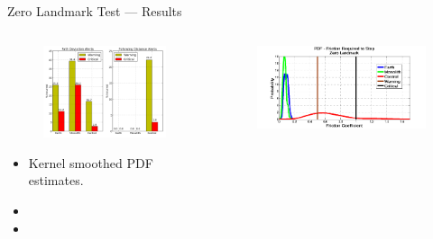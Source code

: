 \documentclass{beamer}
\begin{document}
    \begin{frame}{Zero Landmark Test --- Results}
      \begin{columns}
        \begin{column}{0.5\textwidth}
          \begin{figure}
            \includegraphics[width=\textwidth]{../graphics/zero_landmark_alert_percents.png}
          \end{figure}
          \begin{itemize} \scriptsize
            \item Kernel smoothed PDF estimates.
            \item 
            \item 
          \end{itemize}
        \end{column}
        \begin{column}{0.5\textwidth}
          \begin{figure}
            \includegraphics[width=\textwidth]{../graphics/zero_landmark_mu_distribution.png}

\end{figure}
\end{column}
\end{columns}
\end{frame}
\end{document}
